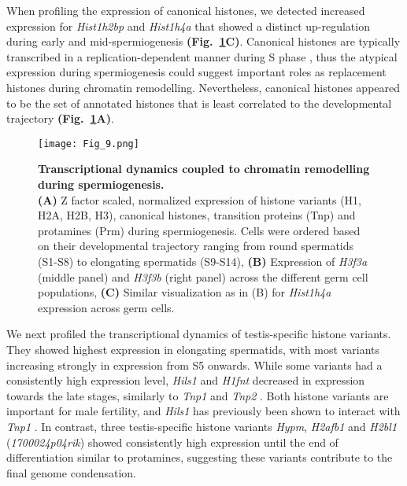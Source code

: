 When profiling the expression of canonical histones, we detected increased expression for \textit{Hist1h2bp} and \textit{Hist1h4a} that showed a distinct up-regulation during early and mid-spermiogenesis \textbf{(Fig.~\ref{fig3:spermiogenesis}C)}. Canonical histones are typically transcribed in a replication-dependent manner during S phase \citep{Marzluff2002}, thus the atypical expression during spermiogenesis could suggest important roles as replacement histones during chromatin remodelling. Nevertheless, canonical histones appeared to be the set of annotated histones that is least correlated to the developmental trajectory \textbf{(Fig.~\ref{fig3:spermiogenesis}A)}.

\newpage

\begin{figure}[!h]
\centering
\texttt{[image: Fig\_9.png]}
\caption[Transcriptional dynamics and chromatin remodelling during spermiogenesis]{\textbf{Transcriptional dynamics coupled to chromatin remodelling during spermiogenesis.} \\
\textbf{(A)} Z factor scaled, normalized expression of histone variants (H1, H2A, H2B, H3), canonical histones, transition proteins (Tnp) and protamines (Prm) during spermiogenesis. Cells were ordered based on their developmental trajectory ranging from round spermatids (S1-S8) to elongating spermatids (S9-S14), \textbf{(B)} Expression of \textit{H3f3a} (middle panel) and \textit{H3f3b} (right panel) across the different germ cell populations, \textbf{(C)} Similar visualization as in (B) for \textit{Hist1h4a} expression across germ cells. }
\label{fig3:spermiogenesis}
\end{figure}

\newpage

We next profiled the transcriptional dynamics of testis-specific histone variants. They showed highest expression in elongating spermatids, with most variants increasing strongly in expression from S5 onwards. While some variants had a consistently high expression level, \textit{Hils1} and \textit{H1fnt} decreased in expression towards the late stages, similarly to \textit{Tnp1} and \textit{Tnp2} \citep{Zhao2004}. Both histone variants are important for male fertility, and \textit{Hils1} has previously been shown to interact with \textit{Tnp1} \citep{Tanaka2005}. In contrast, three testis-specific histone variants \textit{Hypm}, \textit{H2afb1} and \textit{H2bl1} (\textit{1700024p04rik}) showed consistently high expression until the end of differentiation similar to protamines, suggesting these variants contribute to the final genome condensation.


